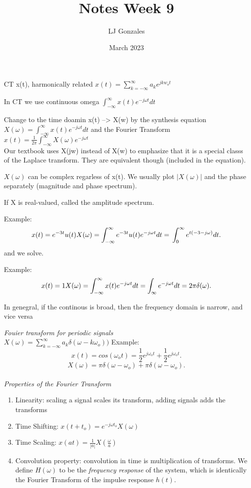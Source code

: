\documentclass{article}
\title{Notes Week 9}
\author{LJ Gonzales}
\date{March 2023}
\begin{document}
\maketitle

CT x(t), harmonically related $x(t)= \sum_{k=-\infty}^{\infty}a_ke^{jkw_ot}$ 

In CT we use continuous omega $\int_{-\infty}^{\infty}x(t)e^{-j\omega t}dt$

Change to the time doamin x(t) --> X(w) by the synthesis equation
$X(\omega)= \int_{-\infty}^{\infty}x(t)e^{-j\omega t}dt$ 
and the Fourier Transform
$x(t)=\frac{1}{2\pi}\int_{-\infty}^{\infty}X(\omega)e^{-j\omega t}$ \\

Our textbook uses X(jw) instead of X(w) to emphasize that it is a special classs of the Laplace transform. They are equivalent though (included in the equation).

$X(\omega)$ can be complex regarless of x(t). We usually plot $|X(\omega)|$ and the phase separately (magnitude and phase spectrum).

If X is real-valued, called the amplitude spectrum.

Example:
\[
 x(t)=e^{-3t}u(t)
 X(\omega)= \int_{-\infty}^{\infty}e^{-3t}u(t)e^{-j\omega t}dt=
 \\
\int_{0}^{\infty}e^{t(-3-j\omega)}dt
.\] and we solve.

Example:
\[
x(t) = 1 \\
X(\omega) = \int_{-\infty}^{\infty}x(t)e^{-j\omega t}dt = \int_{\infty}e^{-j\omega t}dt = 2\pi \delta(\omega)
.\] 

In genegral, if the continous is broad, then the frequency domain is narrow, and vice versa

\emph{Fouier transform for periodic signals} \\
$X(\omega)= \sum_{k=-\infty}^{\infty}a_k \delta(\omega-k\omega_o))$
Example:
\[
x(t)=cos(\omega_o t)=\frac{1}{2}e^{j\omega_o t}+\frac{1}{2}e^{j \omega_o t}
.\] 
\[
X(\omega)=\pi \delta(\omega - \omega_o) + \pi\delta(\omega - \omega_o)
.\]
\\

\emph{Properties of the Fourier Transform} \\

\begin{enumerate}
	\item Linearity: scaling a signal scales its transform, adding signals adds the transforms
	\item Time Shifting: $x(t+t_o)=e^{-j\omega t_o}X(\omega)$
	\item Time Scaling: $x(at)=\frac{1}{|a|}X(\frac{\omega}{a})$
	\item Convolution property: convolution in time is multiplication of transforms. We define $H(\omega)$ to be the \emph{frequency response} of the system, which is identically the Fourier Transform of the impulse response $h(t)$.
\end{enumerate} 
\end{document}
